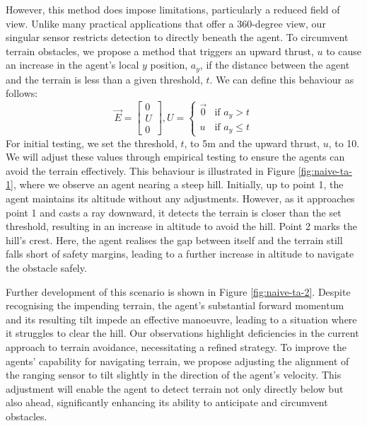\documentclass[12pt]{article}
\begin{document}
However, this method does impose limitations, particularly a reduced field of view. Unlike many practical applications that offer a 360-degree view, our singular sensor restricts detection to directly beneath the agent. To circumvent terrain obstacles, we propose a method that triggers an upward thrust, $u$ to cause an increase in the agent's local $y$ position, $a_y$, if the distance between the agent and the terrain is less than a given threshold, $t$. We can define this behaviour as follows:
\begin{equation}
    \vec{E} = \begin{bmatrix}
        0 \\
        U \\
        0
    \end{bmatrix}, U =
    \begin{cases}
        \vec{0} & \text{if } a_y > t \\
        u & \text{if } a_y \leq t
    \end{cases}
\end{equation}
For initial testing, we set the threshold, $t$, to 5m and the upward thrust, $u$, to 10. We will adjust these values through empirical testing to ensure the agents can avoid the terrain effectively. This behaviour is illustrated in Figure \ref{fig:naive-ta-1}, where we observe an agent nearing a steep hill. Initially, up to point 1, the agent maintains its altitude without any adjustments. However, as it approaches point 1 and casts a ray downward, it detects the terrain is closer than the set threshold, resulting in an increase in altitude to avoid the hill. Point 2 marks the hill's crest. Here, the agent realises the gap between itself and the terrain still falls short of safety margins, leading to a further increase in altitude to navigate the obstacle safely.

Further development of this scenario is shown in Figure \ref{fig:naive-ta-2}. Despite recognising the impending terrain, the agent's substantial forward momentum and its resulting tilt impede an effective manoeuvre, leading to a situation where it struggles to clear the hill. Our observations highlight deficiencies in the current approach to terrain avoidance, necessitating a refined strategy. To improve the agents' capability for navigating terrain, we propose adjusting the alignment of the ranging sensor to tilt slightly in the direction of the agent's velocity. This adjustment will enable the agent to detect terrain not only directly below but also ahead, significantly enhancing its ability to anticipate and circumvent obstacles.
\end{document}
